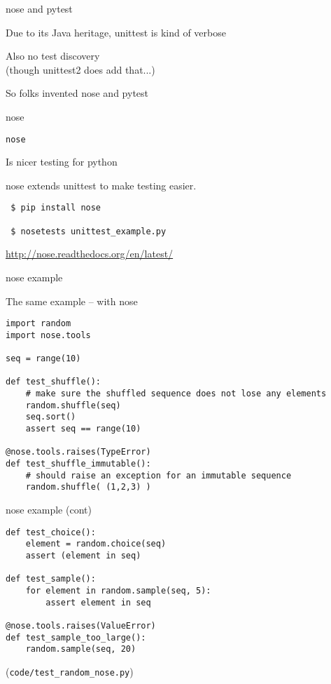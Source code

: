 \documentclass{beamer}
\begin{document}
\begin{frame}[fragile]{nose and pytest}

{\Large Due to its Java heritage, unittest is kind of verbose}

\vfill
{\Large Also no test discovery}\\
{\large \hspace{0.2in}(though unittest2 does add that...) }

\vfill
{\Large So folks invented nose and pytest}

\end{frame} 

\begin{frame}[fragile]{nose}

{\LARGE \verb|nose|}

\vfill
{\Large \hspace{0.2in} Is nicer testing for python}

\vfill
{\Large \hspace{0.2in} nose extends unittest to make testing easier.}

\vfill
\begin{verbatim}
 $ pip install nose

 $ nosetests unittest_example.py 
\end{verbatim}

\vfill
\url{http://nose.readthedocs.org/en/latest/}
\end{frame} 

\begin{frame}[fragile]{nose example}

{\Large The same example -- with nose}

{\small
\begin{verbatim}
import random
import nose.tools

seq = range(10)

def test_shuffle():
    # make sure the shuffled sequence does not lose any elements
    random.shuffle(seq)
    seq.sort()
    assert seq == range(10)

@nose.tools.raises(TypeError)
def test_shuffle_immutable():
    # should raise an exception for an immutable sequence
    random.shuffle( (1,2,3) )
\end{verbatim}
}

\end{frame} 

\begin{frame}[fragile]{nose example (cont) }

{\small
\begin{verbatim}
def test_choice():
    element = random.choice(seq)
    assert (element in seq)

def test_sample():
    for element in random.sample(seq, 5):
        assert element in seq

@nose.tools.raises(ValueError)
def test_sample_too_large():
    random.sample(seq, 20)
\end{verbatim}
}

\vfill
(\verb|code/test_random_nose.py|)

\end{frame} 
\end{document}
